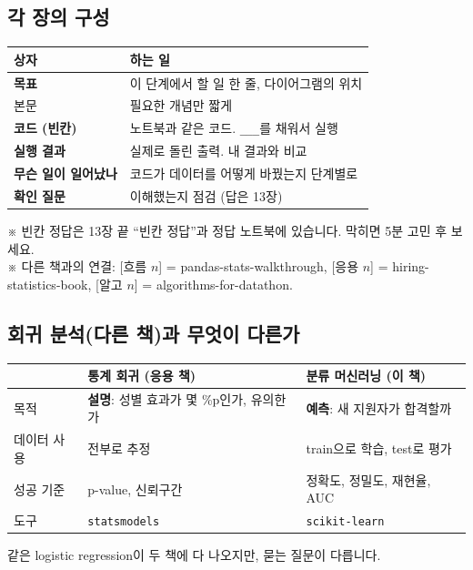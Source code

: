 \documentclass[11pt,a4paper]{article}
\newcommand{\code}[1]{\texttt{#1}}
\newcommand{\aside}[1]{{\footnotesize\color{black!65}#1}}
\begin{document}
\subsection*{각 장의 구성}
\begin{center}\small
\begin{tabular}{@{}l l@{}}
\toprule
상자 & 하는 일 \\
\midrule
\textcolor{blue!45!black}{\textbf{목표}} & 이 단계에서 할 일 한 줄, 다이어그램의 위치 \\
본문 & 필요한 개념만 짧게 \\
\textbf{코드 (빈칸)} & 노트북과 같은 코드. \code{\_\_\_}를 채워서 실행 \\
\textcolor{green!35!black}{\textbf{실행 결과}} & 실제로 돌린 출력. 내 결과와 비교 \\
\textcolor{orange!60!black}{\textbf{무슨 일이 일어났나}} & 코드가 데이터를 어떻게 바꿨는지 단계별로 \\
\textbf{확인 질문} & 이해했는지 점검 (답은 13장) \\
\bottomrule
\end{tabular}
\end{center}
\aside{※ 빈칸 정답은 13장 끝 ``빈칸 정답''과 정답 노트북에 있습니다. 막히면 5분 고민 후 보세요.}\\
\aside{※ 다른 책과의 연결: [흐름 $n$] = pandas-stats-walkthrough, [응용 $n$] = hiring-statistics-book, [알고 $n$] = algorithms-for-datathon.}

\subsection*{회귀 분석(다른 책)과 무엇이 다른가}
\begin{center}\small
\begin{tabular}{@{}l l l@{}}
\toprule
 & 통계 회귀 (응용 책) & 분류 머신러닝 (이 책) \\
\midrule
목적 & \textbf{설명}: 성별 효과가 몇 \%p인가, 유의한가 & \textbf{예측}: 새 지원자가 합격할까 \\
데이터 사용 & 전부로 추정 & train으로 학습, test로 평가 \\
성공 기준 & p-value, 신뢰구간 & 정확도, 정밀도, 재현율, AUC \\
도구 & \code{statsmodels} & \code{scikit-learn} \\
\bottomrule
\end{tabular}
\end{center}
같은 logistic regression이 두 책에 다 나오지만, 묻는 질문이 다릅니다.
\end{document}
